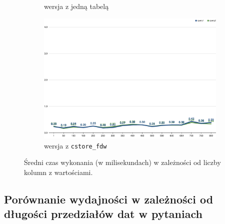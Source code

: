 \documentclass[a4paper,11pt]{article}
\begin{document}
\begin{figure}[h!]
\begin{subfigure}{.49\textwidth}
        \caption{wersja z jedną tabelą}
    \end{subfigure}
    \begin{subfigure}{.5\textwidth}
        \centering
        \includegraphics[width=\textwidth]{charts/execution-time-cstore-fdw-number_of_values}
        \caption{wersja z \texttt{cstore\_fdw}}
    \end{subfigure}
    \caption{Średni czas wykonania (w milisekundach) w zależności od liczby kolumn z wartościami.}
    \label{execution-time-number-of-values}
\end{figure}


\subsection{Porównanie wydajności w zależności od długości przedziałów dat w pytaniach}
\end{document}

